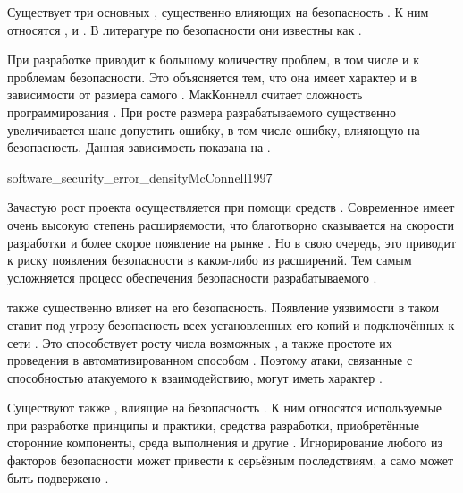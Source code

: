 %
Существует три основных , существенно влияющих на безопасность . 
%
К ним относятся ,  и  .
%
В литературе по безопасности они известны как  .

%
При разработке   приводит к большому количеству проблем, в том числе и к проблемам безопасности.
%
Это объясняется тем, что она имеет характер  и  в зависимости от размера самого  .
%
МакКоннелл считает сложность  программирования .
%
При росте размера разрабатываемого  существенно увеличивается шанс допустить ошибку, в том числе ошибку, влияющую на безопасность.
%
Данная зависимость показана на . 

	{software_security_error_density}{McConnell1997}

%
Зачастую рост проекта осуществляется при помощи средств . 
%
Современное  имеет очень высокую степень расширяемости, что благотворно сказывается на скорости разработки и более скорое появление на рынке .
%
Но в свою очередь, это приводит к риску появления  безопасности в каком-либо из расширений.
%
Тем самым усложняется процесс обеспечения безопасности разрабатываемого .

%
 также существенно влияет на его безопасность.
%
Появление уязвимости в таком  ставит под угрозу безопасность всех установленных его копий и подключённых к сети  . 
%
Это способствует росту числа возможных , а также простоте их проведения в автоматизированном способом .
%
Поэтому атаки, связанные с способностью атакуемого  к взаимодействию, могут иметь характер .

%
Существуют также , влиящие на безопасность .
%
К ним относятся используемые при разработке принципы и практики, средства разработки, приобретённые сторонние компоненты, среда выполнения и другие . 
%
Игнорирование любого из факторов безопасности может привести к серьёзным последствиям, а само  может быть подвержено . 